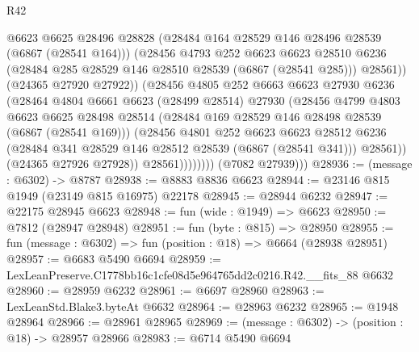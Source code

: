 \begin{lexlean}{R42}
\begin{coremodule}
{                          @6623
                          @6625
                          @28496
                          @28828
                          (@28484 @164 @28529 @146 @28496 @28539 (@6867 (@28541 @164)))
                          (@28456
                            @4793
                            @252
                            @6623
                            @6623
                            @28510
                            @6236
                            (@28484 @285 @28529 @146 @28510 @28539 (@6867 (@28541 @285)))
                            @28561))
                        (@24365 @27920 @27922))
                      (@28456
                        @4805
                        @252
                        @6663
                        @6623
                        @27930
                        @6236
                        (@28464
                          @4804
                          @6661
                          @6623
                          (@28499 @28514)
                          @27930
                          (@28456
                            @4799
                            @4803
                            @6623
                            @6625
                            @28498
                            @28514
                            (@28484 @169 @28529 @146 @28498 @28539 (@6867 (@28541 @169)))
                            (@28456
                              @4801
                              @252
                              @6623
                              @6623
                              @28512
                              @6236
                              (@28484 @341 @28529 @146 @28512 @28539 (@6867 (@28541 @341)))
                              @28561))
                          (@24365 @27926 @27928))
                        @28561))))))))
        (@7082 @27939)))
@28936 := (message : @6302) -> @8787
@28938 := @8883 @8836 @6623
@28944 := @23146 @815 @1949 (@23149 @815 @16975) @22178
@28945 := @28944 @6232
@28947 := @22175 @28945 @6623
@28948 := fun (wide : @1949) => @6623
@28950 := @7812 (@28947 @28948)
@28951 := fun (byte : @815) => @28950
@28955 := fun (message : @6302) => fun (position : @18) => @6664 (@28938 @28951)
@28957 := @6683 @5490 @6694
@28959 := LexLeanPreserve.C1778bb16c1cfe08d5e964765dd2c0216.R42.__fits_88 @6632
@28960 := @28959 @6232
@28961 := @6697 @28960
@28963 := LexLeanStd.Blake3.byteAt @6632
@28964 := @28963 @6232
@28965 := @1948 @28964
@28966 := @28961 @28965
@28969 := (message : @6302) -> (position : @18) -> @28957 @28966
@28983 := @6714
    @5490
    @6694
}
\end{coremodule}
\end{lexlean}
